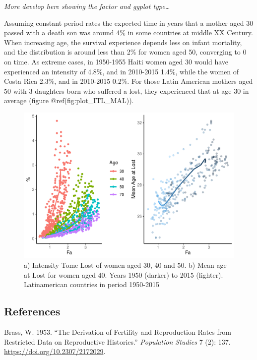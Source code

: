 \documentclass[
]{article}
\begin{document}
\emph{More develop here showing the factor and ggplot type\ldots{}}

Assuming constant period rates the expected time in years that a mother
aged 30 passed with a death son was around 4\% in some countries at
middle XX Century. When increasing age, the survival experience depends
less on infant mortality, and the distribution is around less than 2\%
for women aged 50, converging to 0 on time. As extreme cases, in
1950-1955 Haiti women aged 30 would have experienced an intensity of
4.8\%, and in 2010-2015 1.4\%, while the women of Costa Rica 2.3\%, and
in 2010-2015 0.2\%. For those Latin American mothers aged 50 with 3
daughters born who suffered a lost, they experienced that at age 30 in
average (figure @ref(fig:plot\_ITL\_MAL)).

\begin{figure}
\centering
\includegraphics{paper_files/figure-latex/plot_ITL_MAL-1.pdf}
\caption{a) Intensity Tome Lost of women aged 30, 40 and 50. b) Mean age
at Lost for women aged 40. Years 1950 (darker) to 2015 (lighter).
Latinamerican countries in period 1950-2015}
\end{figure}

\hypertarget{references}{%
\subsection*{References}\label{references}}

\hypertarget{refs}{}
\leavevmode\hypertarget{ref-brass_derivation_1953}{}%
Brass, W. 1953. ``The Derivation of Fertility and Reproduction Rates
from Restricted Data on Reproductive Histories.'' \emph{Population
Studies} 7 (2): 137. \url{https://doi.org/10.2307/2172029}.
\end{document}

